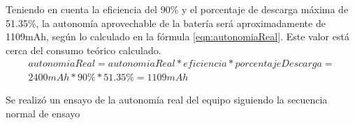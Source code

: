 Teniendo en cuenta la eficiencia del 90\% y el porcentaje de descarga máxima de 51.35\%, la autonomía aprovechable de la batería será aproximadamente de 1109mAh, según lo calculado en la fórmula \ref{eqn:autonomiaReal}.
Este valor está cerca del consumo teórico calculado. 
\begin{equation} \label{eqn:autonomiaReal}
\begin{split}
autonomiaReal = autonomiaReal*eficiencia*porcentajeDescarga = \\ 2400mAh * 90\% * 51.35\% = 1109 mAh
\end{split}
\end{equation}

Se realizó un ensayo de la autonomía real del equipo siguiendo la secuencia normal de ensayo 

